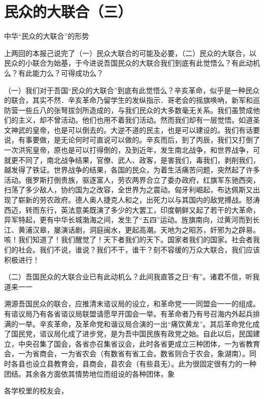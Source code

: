 \section{民众的大联合（三）}



中华“民众的大联合”的形势

上两回的本报己说完了（一）民众大联合的可能及必要，（二）民众的大联合，以民众的小联合为始基，于今进说吾国民众的大联合我们到底有此觉悟么？有此动机么？有此能力么？可得成功么？

（一）我们对于吾国“民众的大联合”到底有此觉悟么？辛亥革命，似乎是一种民众的联合，其实不然．辛亥革命乃留学生的发纵指示．哥老会的摇旗唤吶，新军和巡防营一些丘八的张弩拔剑所造成的，与我们民众的大多数毫无关系。我们虽赞成他们的主义，却不曾活动。他们也用不着我们活动。然而我们却有一层觉悟。如道圣文神武的皇帝，也是可以倒去的。大逆不道的民主，也是可以建设的。我们有话要说，有事要做，是无论何时可直说可以做的。辛亥而后，到了丙辰，我们又打倒了一次洪宪皇帝，原也是可以打得倒的，及到近年，发生南北战争，和世界战争，可就更不同了，南北战争结果，官僚、武人、政客，是害我们，毒我们，剥削我们，越发得了铁证。世界战争的结果，各国的民众，为着生活痛苦问题，突然起了许多活动。俄罗斯打倒贵族，驱逐富人，劳农两界合立了委办政府，红旗军东驰西突，扫荡了多少敌人，协约国为之改容，全世界为之震动。匈牙利崛起，布达佩斯又出现了崭新的劳农政府。德人奥人捷克人和之，出死力以与其国内的敌党搏战。怒涛西迈，转而东行，英法意美既演了多少的大罢工，印度朝鲜又起了若干的大革命，异军特起，更有中华长城渤海之间，发生了“五四”运动。旌旗南向，过黄河而到长江、黄浦汉皋，屡演话剧，洞庭闽水，更起高潮。天地为之昭苏，奸邪为之辟易。咳！我们知道了！我们醒觉了！天下者我们的天下。国家者我们的国家。社会者我们的社会。我们不说，谁说？我们不干，谁干？刻不容缓的万众大联合，我们应该积极进行！

（二）吾国民众的大联合业已有此动机么？此间我直答之日“有”。诸君不信，听我道来一一

溯源吾国民众的联合，应推清末谘议局的设立，和革命党一一同盟会一一的组成。有谘议局乃有各省谘议局联盟请愿早开国会一举。有革命者乃有号召海内外起兵排满的一举。辛亥革命，及革命党和谐议局合演的一出“痛饮黄龙”。其后革命党化成了国民党，谘议局化成了进步党，是为吾中国民族有政党之始。自此以后，民国建立，中央召集了国会，各省亦召集省议会，此时各省更成立三种团体，一为省教育会，一为省商会，一为省农会（有数省有省工会。数省则合于农会，象湖南）。同时各县也设立县教育会，县商会，县农会（有些县无）。此为很固定很有力的一种团结。其余各方面依其情势地位而组设的各种团体，象

各学校里的校友会，

